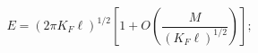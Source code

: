 \begin{equation}
\label{scaling}
E=(2\pi K_F \ell)^{1/2}[1+O(\frac{M}{(K_F\ell )^{1/2}})];
\end{equation}

